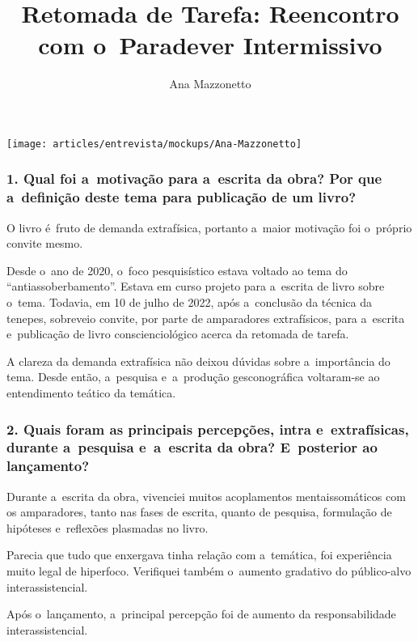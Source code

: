 \documentclass{gescons}
\author{Ana Mazzonetto}
\title{Retomada de Tarefa: Reencontro com o~Paradever Intermissivo}
\begin{document}
    \makeentrevistatitle


    \begin{multicols}{2}


\begin{center}

    \texttt{[image: articles/entrevista/mockups/Ana-Mazzonetto]}
\end{center}

\subsubsection{1. Qual foi a~motivação para a~escrita da obra? Por que a~definição deste tema para publicação de um livro?}

O livro é~fruto de demanda extrafísica, portanto a~maior motivação foi o~próprio convite mesmo. 

Desde o~ano de 2020, o~foco pesquisístico estava voltado ao tema do “antiassoberbamento”. Estava em curso projeto para a~escrita de livro sobre o~tema. Todavia, em 10 de julho de 2022, após a~conclusão da técnica da tenepes, sobreveio convite, por parte de amparadores extrafísicos, para a~escrita e~publicação de livro conscienciológico acerca da retomada de tarefa. 

A clareza da demanda extrafísica não deixou dúvidas sobre a~importância do tema. Desde então, a~pesquisa e~a~produção gesconográfica voltaram-se ao entendimento teático da temática.

\subsubsection{2. Quais foram as principais percepções, intra e~extrafísicas, durante a~pesquisa e~a~escrita da obra? E~posterior ao lançamento?}

Durante a~escrita da obra, vivenciei muitos acoplamentos mentaissomáticos com os amparadores, tanto nas fases de escrita, quanto de pesquisa, formulação de hipóteses e~reflexões plasmadas no livro. 

Parecia que tudo que enxergava tinha relação com a~temática, foi experiência muito legal de hiperfoco. Verifiquei também o~aumento gradativo do público-alvo interassistencial.

Após o~lançamento, a~principal percepção foi de aumento da responsabilidade interassistencial. 


\end{multicols}
\end{document}
